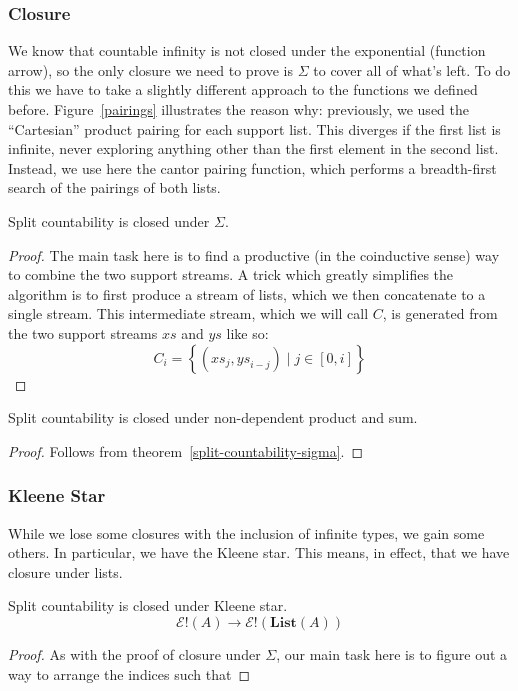 \subsubsection{Closure}
We know that countable infinity is not closed under the exponential (function
arrow), so the only closure we need to prove is \(\Sigma\) to cover all of
what's left.
To do this we have to take a slightly different approach to the functions we
defined before.
Figure~\ref{pairings} illustrates the reason why: previously, we used the
``Cartesian'' product pairing for each support list.
This diverges if the first list is infinite, never exploring anything other than
the first element in the second list.
Instead, we use here the cantor pairing function, which performs a breadth-first
search of the pairings of both lists.

\begin{rm-theorem} \label{split-countability-sigma}
  Split countability is closed under \(\Sigma\).
\end{rm-theorem}
\begin{proof}
  The main task here is to find a productive (in the coinductive sense) way to
  combine the two support streams.
  A trick which greatly simplifies the algorithm is to first produce a stream of
  lists, which we then concatenate to a single stream.
  This intermediate stream, which we will call \(C\), is generated from the two
  support streams \(\mathit{xs}\) and \(\mathit{ys}\) like so:
  \begin{equation}
    C_i = \left\{ \left( \mathit{xs}_j , \mathit{ys}_{i - j} \right) \mid j \in [0,i] \right\}
  \end{equation}
\end{proof}
\begin{rm-lemma}
  Split countability is closed under non-dependent product and sum.
\end{rm-lemma}
\begin{proof}
  Follows from theorem~\ref{split-countability-sigma}.
\end{proof}
\subsubsection{Kleene Star}
While we lose some closures with the inclusion of infinite types, we gain some
others.
In particular, we have the Kleene star.
This means, in effect, that we have closure under lists.
\begin{rm-theorem}
  Split countability is closed under Kleene star.
  \begin{equation}
    \mathcal{E}!(A) \rightarrow \mathcal{E}!(\mathbf{List}(A))
  \end{equation}
\end{rm-theorem}
\begin{proof}
  As with the proof of closure under \(\Sigma\), our main task here is to figure
  out a way to arrange the indices such that 
\end{proof}
